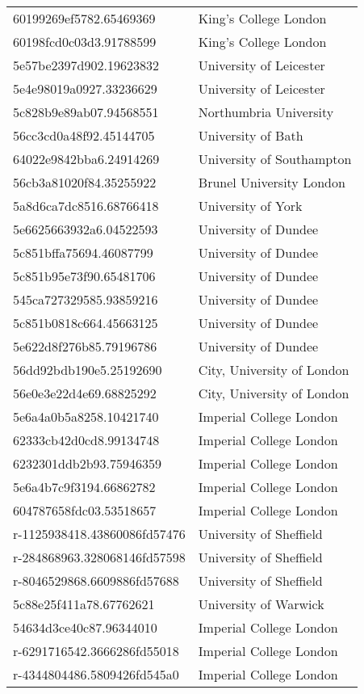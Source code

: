 \begin{tabular}{ll}
60199269ef5782.65469369 & King's College London \\
60198fcd0c03d3.91788599 & King's College London \\
5e57be2397d902.19623832 & University of Leicester \\
5e4e98019a0927.33236629 & University of Leicester \\
5c828b9e89ab07.94568551 & Northumbria University \\
56cc3cd0a48f92.45144705 & University of Bath \\
64022e9842bba6.24914269 & University of Southampton \\
56cb3a81020f84.35255922 & Brunel University London \\
5a8d6ca7dc8516.68766418 & University of York \\
5e6625663932a6.04522593 & University of Dundee \\
5c851bffa75694.46087799 & University of Dundee \\
5c851b95e73f90.65481706 & University of Dundee \\
545ca727329585.93859216 & University of Dundee \\
5c851b0818c664.45663125 & University of Dundee \\
5e622d8f276b85.79196786 & University of Dundee \\
56dd92bdb190e5.25192690 & City, University of London \\
56e0e3e22d4e69.68825292 & City, University of London \\
5e6a4a0b5a8258.10421740 & Imperial College London \\
62333cb42d0cd8.99134748 & Imperial College London \\
6232301ddb2b93.75946359 & Imperial College London \\
5e6a4b7c9f3194.66862782 & Imperial College London \\
604787658fdc03.53518657 & Imperial College London \\
r-1125938418.43860086fd57476 & University of Sheffield \\
r-284868963.328068146fd57598 & University of Sheffield \\
r-8046529868.6609886fd57688 & University of Sheffield \\
5c88e25f411a78.67762621 & University of Warwick \\
54634d3ce40c87.96344010 & Imperial College London \\
r-6291716542.3666286fd55018 & Imperial College London \\
r-4344804486.5809426fd545a0 & Imperial College London \\

\end{tabular}
